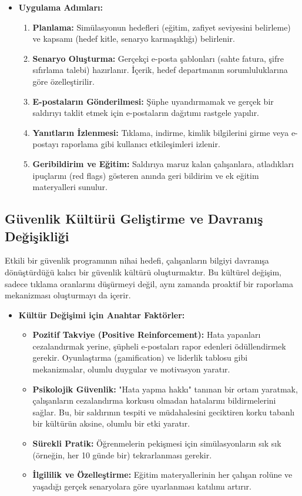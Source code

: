 \begin{itemize}
    \item \textbf{Uygulama Adımları:}
    \begin{enumerate}
        \item \textbf{Planlama:} Simülasyonun hedefleri (eğitim, zafiyet seviyesini belirleme) ve kapsamı (hedef kitle, senaryo karmaşıklığı) belirlenir.
        \item \textbf{Senaryo Oluşturma:} Gerçekçi e-posta şablonları (sahte fatura, şifre sıfırlama talebi) hazırlanır. İçerik, hedef departmanın sorumluluklarına göre özelleştirilir.
        \item \textbf{E-postaların Gönderilmesi:} Şüphe uyandırmamak ve gerçek bir saldırıyı taklit etmek için e-postaların dağıtımı rastgele yapılır.
        \item \textbf{Yanıtların İzlenmesi:} Tıklama, indirme, kimlik bilgilerini girme veya e-postayı raporlama gibi kullanıcı etkileşimleri izlenir.
        \item \textbf{Geribildirim ve Eğitim:} Saldırıya maruz kalan çalışanlara, atladıkları ipuçlarını (red flags) gösteren anında geri bildirim ve ek eğitim materyalleri sunulur.
    \end{enumerate}
\end{itemize}

\subsection{Güvenlik Kültürü Geliştirme ve Davranış Değişikliği}

Etkili bir güvenlik programının nihai hedefi, çalışanların bilgiyi davranışa dönüştürdüğü kalıcı bir güvenlik kültürü oluşturmaktır. Bu kültürel değişim, sadece tıklama oranlarını düşürmeyi değil, aynı zamanda proaktif bir raporlama mekanizması oluşturmayı da içerir.

\begin{itemize}
    \item \textbf{Kültür Değişimi için Anahtar Faktörler:}
    \begin{itemize}
        \item \textbf{Pozitif Takviye (Positive Reinforcement):} Hata yapanları cezalandırmak yerine, şüpheli e-postaları rapor edenleri ödüllendirmek gerekir. Oyunlaştırma (gamification) ve liderlik tablosu gibi mekanizmalar, olumlu duygular ve motivasyon yaratır.
        \item \textbf{Psikolojik Güvenlik:} "Hata yapma hakkı" tanınan bir ortam yaratmak, çalışanların cezalandırma korkusu olmadan hatalarını bildirmelerini sağlar. Bu, bir saldırının tespiti ve müdahalesini geciktiren korku tabanlı bir kültürün aksine, olumlu bir etki yaratır.
        \item \textbf{Sürekli Pratik:} Öğrenmelerin pekişmesi için simülasyonların sık sık (örneğin, her 10 günde bir) tekrarlanması gerekir.
        \item \textbf{İlgililik ve Özelleştirme:} Eğitim materyallerinin her çalışan rolüne ve yaşadığı gerçek senaryolara göre uyarlanması katılımı artırır.
    \end{itemize}
\end{itemize}

